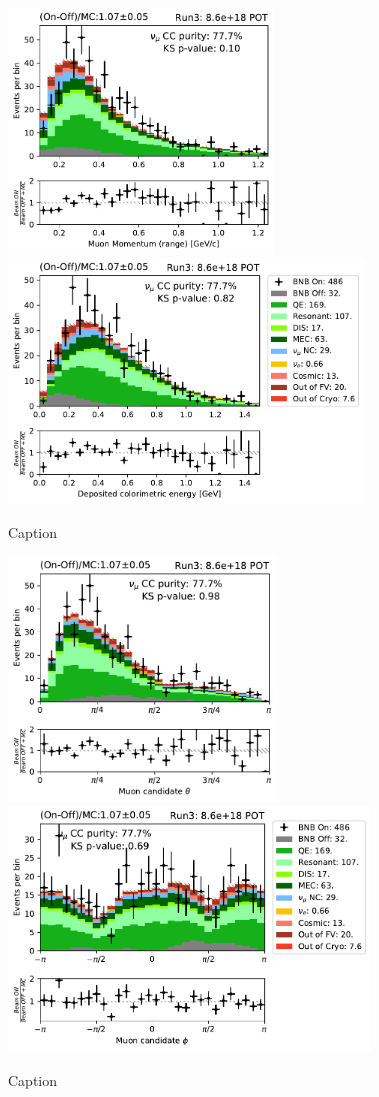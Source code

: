 \begin{figure}
    \centering
    \includegraphics[height=6.5cm]{NuMuCCsel/Images/run3/numu_rangemom_run3.pdf} \hspace{2mm}
    \includegraphics[height=6.5cm]{NuMuCCsel/Images/run3/numu_caloe_run3.pdf}
    \caption{Caption}
    \label{fig:numu_energy}
\end{figure}

\begin{figure}
    \centering
    \includegraphics[height=6.5cm]{NuMuCCsel/Images/run3/numu_theta_run3.pdf} \hspace{2mm}
    \includegraphics[height=6.5cm]{NuMuCCsel/Images/run3/numu_phi_run3.pdf}
    \caption{Caption}
    \label{fig:numu_angles}
\end{figure}
